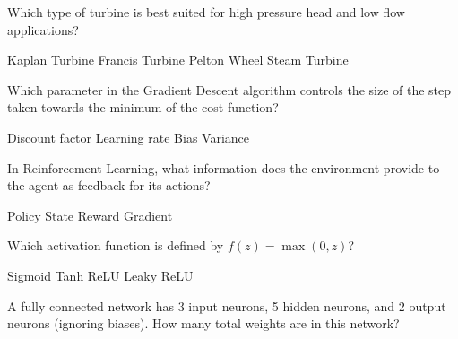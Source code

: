 \documentclass[12pt]{exam}
\begin{document}
\begin{questions}
                \question Which type of turbine is best suited for high pressure head and low flow applications? \\ %
                    \begin{oneparchoices}
                        \choice Kaplan Turbine
                        \choice Francis Turbine
                        \choice Pelton Wheel %
                        \choice Steam Turbine
                    \end{oneparchoices}
                
		      \question Which parameter in the Gradient Descent algorithm controls the size of the step taken towards the minimum of the cost function? \\ 
                \begin{oneparchoices}
                    \choice Discount factor
                    \choice Learning rate %
                    \choice Bias
                    \choice Variance
                \end{oneparchoices}
                
                \question In Reinforcement Learning, what information does the environment provide to the agent as feedback for its actions? \\ 
                \begin{oneparchoices}
                    \choice Policy
                    \choice State
                    \choice Reward %
                    \choice Gradient
                \end{oneparchoices}
                
                \question Which activation function is defined by $f(z) = \max(0, z)$? \\ 
                \begin{oneparchoices}
                    \choice Sigmoid
                    \choice Tanh
                    \choice ReLU %
                    \choice Leaky ReLU
                \end{oneparchoices}
                
                \question A fully connected network has 3 input neurons, 5 hidden neurons, and 2 output neurons (ignoring biases). How many total weights are in this network? \\ 
                \begin{oneparchoices}
                \end{oneparchoices}
                

\end{questions}
\end{document}
